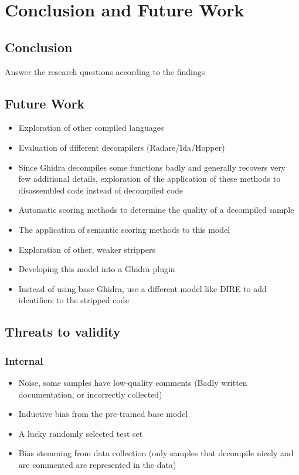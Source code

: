 \chapter{Conclusion and Future Work}
\label{conclusion}
\section{Conclusion}
Answer the research questions according to the findings

\section{Future Work}

\begin{itemize}
    \item Exploration of other compiled languages
    \item Evaluation of different decompilers (Radare/Ida/Hopper)
    \item Since Ghidra decompiles some functions badly and generally recovers very few additional details, exploration of the application of these methods to disassembled code instead of decompiled code
    \item Automatic scoring methods to determine the quality of a decompiled sample
    \item The application of semantic scoring methods to this model
    \item Exploration of other, weaker strippers
    \item Developing this model into a Ghidra plugin
    \item Instead of using base Ghidra, use a different model like DIRE to add identifiers to the stripped code
\end{itemize}
\section{Threats to validity}
\subsection{Internal}
\begin{itemize}
    \item Noise, some samples have low-quality comments (Badly written documentation, or incorrectly collected)
    \item Inductive bias from the pre-trained base model
    \item A lucky randomly selected test set
    \item Bias stemming from data collection (only samples that decompile nicely and are commented are represented in the data)
\end{itemize}
